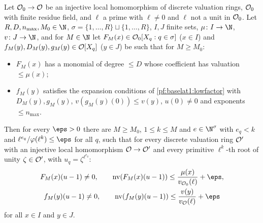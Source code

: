 \begin{theorem}\label{pf:baselat1:orderEval}
Let $\mathcal O_0\to\mathcal O$ be an injective local homomorphism of discrete valuation rings, $\mathcal O_0$ with
finite residue field, and $\ell$ a prime with $\ell\ne0$ and $\ell$ not a unit in $\mathcal O_0$. Let $R,D,n_{\max},M_0\in\N$,
$\sigma=\{1,\dots,R\}\sqcup\{1,\dots,R\}$, $I,J$ finite sets, $\mu\colon I\to\N$, $v\colon J\to\N$, and for $M\in\N$ let
$F_M(x)\in\mathcal O_0[X_q:q\in\sigma]$ ($x\in I$) and $f_M(y),D_M(y),g_M(y)\in\mathcal O[X_q]$ ($y\in J$) be such that for
$M\ge M_0$:
\begin{itemize}
\item $F_M(x)$ has a monomial of degree $\le D$ whose coefficient has valuation $\le\mu(x)$;
\item $f_M(y)$ satisfies the expansion conditions of \cref{pf:baselat1:lowfactor} with $D_M(y),g_M(y)$, $v(g_M(y)(0))\le v(y)$,
  $u(0)\ne0$ and exponents $\le n_{\max}$.
\end{itemize}
Then for every $\eps>0$ there are $M\ge M_0$, $1\le k\le M$ and $e\in\N^\sigma$ with $e_q<k$ and
$\ell^{e_q}/\varphi(\ell^k)\le\eps$ for all $q$, such that for every discrete valuation ring $\mathcal O'$ with an injective
local homomorphism $\mathcal O\to\mathcal O'$ and every primitive $\ell^k$-th root of unity $\zeta\in\mathcal O'$, with
$u_q=\zeta^{\ell^{e_q}}$:
\begin{gather*}
F_M(x)(u-1)\ne0,\qquad \baselatonenv(F_M(x)(u-1))\le\frac{\mu(x)}{v_{\baselatoneO_0}(\ell)}+\eps,\\
f_M(y)(u-1)\ne0,\qquad \baselatonenv(f_M(y)(u-1))\le\frac{v(y)}{v_{\baselatoneO}(\ell)}+\eps
\end{gather*}
for all $x\in I$ and $y\in J$.
\end{theorem}


